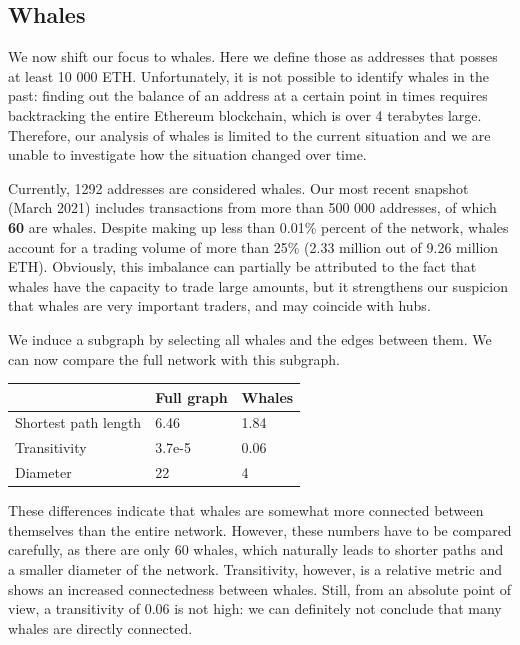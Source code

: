 \documentclass[10pt,a4paper]{article}
\begin{document}
\begin{multicols}{2}
\subsection{Whales}
We now shift our focus to whales. Here we define those as addresses that posses at least 10 000 ETH. Unfortunately, it is not possible to identify whales in the past: finding out the balance of an address at a certain point in times requires backtracking the entire Ethereum blockchain, which is over 4 terabytes large. Therefore, our analysis of whales is limited to the current situation and we are unable to investigate how the situation changed over time.

Currently, 1292 addresses are considered whales. Our most recent snapshot (March 2021) includes transactions from more than 500 000 addresses, of which \textbf{60} are whales. Despite making up less than 0.01\% percent of the network, whales account for a trading volume of more than 25\% (2.33 million out of 9.26 million ETH). Obviously, this imbalance can partially be attributed to the fact that whales have the capacity to trade large amounts, but it strengthens our suspicion that whales are very important traders, and may coincide with hubs.

We induce a subgraph by selecting all whales and the edges between them. We can now compare the full network with this subgraph.

\vspace{5pt}
\bgroup
\def\arraystretch{1.5}
\begin{tabular}{p{}|p{}|p{}}
 & \textbf{Full graph} & \textbf{Whales} \\ 
\hline 
Shortest path length & 6.46 & 1.84 \\
Transitivity & 3.7e-5 & 0.06\\
Diameter & 22 & 4 \\
\end{tabular}
\egroup
\vspace{5pt}

These differences indicate that whales are somewhat more connected between themselves than the entire network. However, these numbers have to be compared carefully, as there are only 60 whales, which naturally leads to shorter paths and a smaller diameter of the network. Transitivity, however, is a relative metric and shows an increased connectedness between whales. Still, from an absolute point of view, a transitivity of 0.06 is not high: we can definitely not conclude that many whales are directly connected.


\end{multicols}
\end{document}
